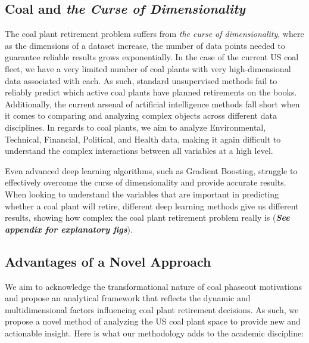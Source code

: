 

\subsection{Coal and \textit{the Curse of Dimensionality}}

The coal plant retirement problem suffers from \textit{the curse of dimensionality}, where as the dimensions of a dataset 
increase, the number of data points needed to guarantee reliable results grows exponentially. In the case of the current US coal 
fleet, we have a very limited number of coal plants with very high-dimensional data associated with each. As such, standard 
unsupervised methods fail to reliably predict which active coal plants have planned retirements on the books. Additionally, the 
current arsenal of artificial intelligence methods fall short when it comes to comparing and analyzing complex objects across different 
data disciplines. In regards to coal plants, we aim to analyze Environmental, Technical, Financial, Political, and Health data, making 
it again difficult to understand the complex interactions between all variables at a high level. 

Even advanced deep learning algorithms, 
such as Gradient Boosting, struggle to effectively overcome the curse of dimensionality and provide accurate results. When looking to 
understand the variables that are important in predicting whether a coal plant will retire, different deep learning methods give us 
different results, showing how complex the coal plant retirement problem really is (\textit{\textbf{See appendix for explanatory figs}}).


\subsection{Advantages of a Novel Approach}
We aim to acknowledge the transformational nature of coal phaseout motivations and propose an analytical framework that reflects the 
dynamic and multidimensional factors influencing coal plant retirement decisions. As such, we propose a novel method of analyzing the 
US coal plant space to provide new and actionable insight. Here is what our methodology adds to the academic discipline:

